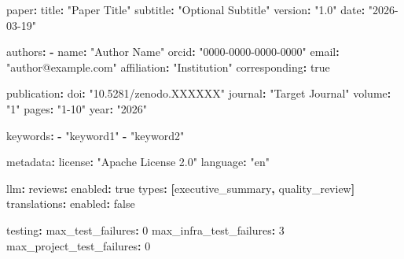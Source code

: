 \documentclass[
]{article}
\newenvironment{Shaded}{}{}
\newcommand{\AttributeTok}[1]{\textcolor[rgb]{0.49,0.56,0.16}{#1}}
\newcommand{\CharTok}[1]{\textcolor[rgb]{0.25,0.44,0.63}{#1}}
\newcommand{\DecValTok}[1]{\textcolor[rgb]{0.25,0.63,0.44}{#1}}
\newcommand{\FunctionTok}[1]{\textcolor[rgb]{0.02,0.16,0.49}{#1}}
\newcommand{\KeywordTok}[1]{\textcolor[rgb]{0.00,0.44,0.13}{\textbf{#1}}}
\newcommand{\StringTok}[1]{\textcolor[rgb]{0.25,0.44,0.63}{#1}}
\begin{document}
\begin{Shaded}
\begin{Highlighting}[]
\FunctionTok{paper}\KeywordTok{:}
\AttributeTok{  }\FunctionTok{title}\KeywordTok{:}\AttributeTok{ }\StringTok{"Paper Title"}
\AttributeTok{  }\FunctionTok{subtitle}\KeywordTok{:}\AttributeTok{ }\StringTok{"Optional Subtitle"}
\AttributeTok{  }\FunctionTok{version}\KeywordTok{:}\AttributeTok{ }\StringTok{"1.0"}
\AttributeTok{  }\FunctionTok{date}\KeywordTok{:}\AttributeTok{ }\StringTok{"2026{-}03{-}19"}

\FunctionTok{authors}\KeywordTok{:}
\AttributeTok{  }\KeywordTok{{-}}\AttributeTok{ }\FunctionTok{name}\KeywordTok{:}\AttributeTok{ }\StringTok{"Author Name"}
\AttributeTok{    }\FunctionTok{orcid}\KeywordTok{:}\AttributeTok{ }\StringTok{"0000{-}0000{-}0000{-}0000"}
\AttributeTok{    }\FunctionTok{email}\KeywordTok{:}\AttributeTok{ }\StringTok{"author@example.com"}
\AttributeTok{    }\FunctionTok{affiliation}\KeywordTok{:}\AttributeTok{ }\StringTok{"Institution"}
\AttributeTok{    }\FunctionTok{corresponding}\KeywordTok{:}\AttributeTok{ }\CharTok{true}

\FunctionTok{publication}\KeywordTok{:}
\AttributeTok{  }\FunctionTok{doi}\KeywordTok{:}\AttributeTok{ }\StringTok{"10.5281/zenodo.XXXXXX"}
\AttributeTok{  }\FunctionTok{journal}\KeywordTok{:}\AttributeTok{ }\StringTok{"Target Journal"}
\AttributeTok{  }\FunctionTok{volume}\KeywordTok{:}\AttributeTok{ }\StringTok{"1"}
\AttributeTok{  }\FunctionTok{pages}\KeywordTok{:}\AttributeTok{ }\StringTok{"1{-}10"}
\AttributeTok{  }\FunctionTok{year}\KeywordTok{:}\AttributeTok{ }\StringTok{"2026"}

\FunctionTok{keywords}\KeywordTok{:}
\AttributeTok{  }\KeywordTok{{-}}\AttributeTok{ }\StringTok{"keyword1"}
\AttributeTok{  }\KeywordTok{{-}}\AttributeTok{ }\StringTok{"keyword2"}

\FunctionTok{metadata}\KeywordTok{:}
\AttributeTok{  }\FunctionTok{license}\KeywordTok{:}\AttributeTok{ }\StringTok{"Apache License 2.0"}
\AttributeTok{  }\FunctionTok{language}\KeywordTok{:}\AttributeTok{ }\StringTok{"en"}

\FunctionTok{llm}\KeywordTok{:}
\AttributeTok{  }\FunctionTok{reviews}\KeywordTok{:}
\AttributeTok{    }\FunctionTok{enabled}\KeywordTok{:}\AttributeTok{ }\CharTok{true}
\AttributeTok{    }\FunctionTok{types}\KeywordTok{:}\AttributeTok{ }\KeywordTok{[}\AttributeTok{executive\_summary}\KeywordTok{,}\AttributeTok{ quality\_review}\KeywordTok{]}
\AttributeTok{  }\FunctionTok{translations}\KeywordTok{:}
\AttributeTok{    }\FunctionTok{enabled}\KeywordTok{:}\AttributeTok{ }\CharTok{false}

\FunctionTok{testing}\KeywordTok{:}
\AttributeTok{  }\FunctionTok{max\_test\_failures}\KeywordTok{:}\AttributeTok{ }\DecValTok{0}
\AttributeTok{  }\FunctionTok{max\_infra\_test\_failures}\KeywordTok{:}\AttributeTok{ }\DecValTok{3}
\AttributeTok{  }\FunctionTok{max\_project\_test\_failures}\KeywordTok{:}\AttributeTok{ }\DecValTok{0}
\end{Highlighting}
\end{Shaded}
\end{document}
